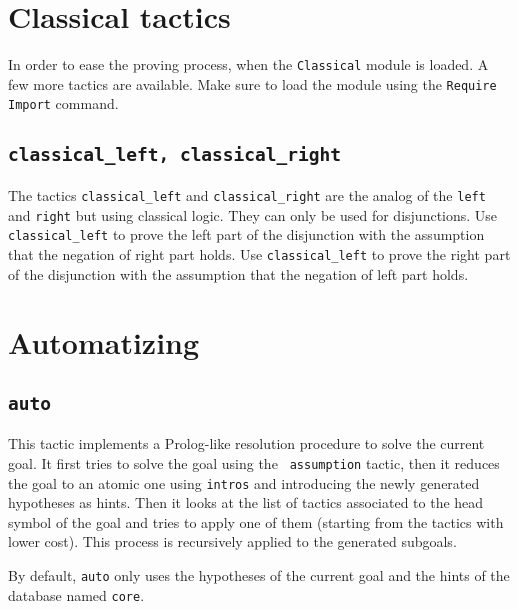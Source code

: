 \section[Classical tactics]{Classical tactics\label{ClassicalTactics}}

In order to ease the proving process, when the {\tt Classical} module is loaded. A few more tactics are available. Make sure to load the module using the \texttt{Require Import} command.

\subsection{{\tt classical\_left, classical\_right}  }

The tactics \texttt{classical\_left} and \texttt{classical\_right} are the analog of the \texttt{left} and \texttt{right} but using classical logic. They can only be used for disjunctions.
Use  \texttt{classical\_left} to prove the left part of the disjunction with the assumption that the negation of right part holds. 
Use \texttt{classical\_left} to prove the right part of the disjunction with the assumption that the negation of left part holds. 

\section{Automatizing
\label{Automatizing}}

\subsection{\tt auto
\label{auto}
}

This tactic implements a Prolog-like resolution procedure to solve the
current goal. It first tries to solve the goal using the {\tt
  assumption} tactic, then it reduces the goal to an atomic one using
{\tt intros} and introducing the newly generated hypotheses as hints.
Then it looks at the list of tactics associated to the head symbol of
the goal and tries to apply one of them (starting from the tactics
with lower cost). This process is recursively applied to the generated
subgoals. 

By default, \texttt{auto} only uses the hypotheses of the current goal and the
hints of the database named {\tt core}. 


